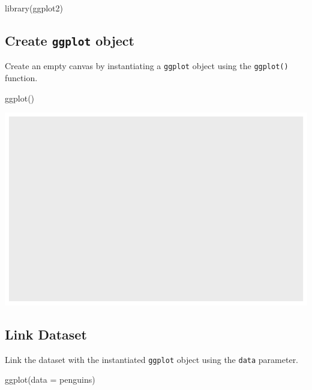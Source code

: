 \documentclass[
  letterpaper,
  DIV=11,
  numbers=noendperiod]{scrreprt}
\newenvironment{Shaded}{\begin{snugshade}}{\end{snugshade}}
\newcommand{\AttributeTok}[1]{\textcolor[rgb]{0.40,0.45,0.13}{#1}}
\newcommand{\FunctionTok}[1]{\textcolor[rgb]{0.28,0.35,0.67}{#1}}
\newcommand{\NormalTok}[1]{\textcolor[rgb]{0.00,0.23,0.31}{#1}}
\begin{document}
\begin{Shaded}
\begin{Highlighting}[]
\FunctionTok{library}\NormalTok{(ggplot2)}
\end{Highlighting}
\end{Shaded}

\subsection{\texorpdfstring{Create \texttt{ggplot}
object}{Create ggplot object}}\label{create-ggplot-object}

Create an empty canvas by instantiating a \texttt{ggplot} object using
the \texttt{ggplot()} function.

\begin{Shaded}
\begin{Highlighting}[]
\FunctionTok{ggplot}\NormalTok{()}
\end{Highlighting}
\end{Shaded}

\includegraphics{src/r-for-data-science/01-data-viz_files/figure-pdf/unnamed-chunk-6-1.pdf}

\subsection{Link Dataset}\label{link-dataset}

Link the dataset with the instantiated \texttt{ggplot} object using the
\texttt{data} parameter.

\begin{Shaded}
\begin{Highlighting}[]
\FunctionTok{ggplot}\NormalTok{(}\AttributeTok{data =}\NormalTok{ penguins)}
\end{Highlighting}
\end{Shaded}
\end{document}
